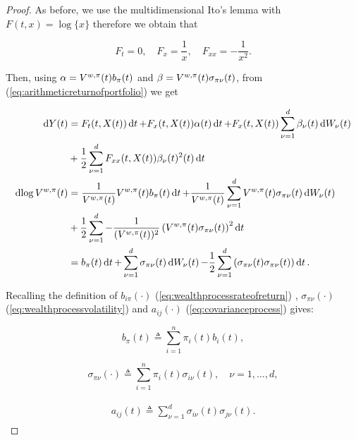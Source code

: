 \documentclass[british]{amsart} \usepackage{lmodern}
\numberwithin{equation}{section} \numberwithin{figure}{section}
\theoremstyle{plain} \newtheorem{thm}{\protect\theoremname}[section]
\theoremstyle{definition} \newtheorem{defn}[thm]{\protect\definitionname}
\theoremstyle{plain} \newtheorem{assumption}[thm]{\protect\assumptionname}
\theoremstyle{plain} \newtheorem{lem}[thm]{\protect\lemmaname}
\theoremstyle{plain} \newtheorem{prop}[thm]{\protect\propositionname}
\theoremstyle{remark} \newtheorem{rem}[thm]{\protect\remarkname}
\theoremstyle{plain} \newtheorem{cor}[thm]{\protect\corollaryname}
\renewcommand{\d}[1]{\mathop{\mathrm{d}{#1}}}
\newcommand{\defeq}{\mathop{\triangleq}} \newcommand{\almostsurely}{\text{a.s.}}
\newcommand{\V}{V^{w,\pi}}
\begin{document}
\newcommand{\VFxx}{-\frac{1}{(\V(t))^2}}
\begin{proof}

  As before, we use the multidimensional Ito's lemma with $F(t,x)=\log\{x\}$ therefore we obtain that

  \begin{equation}
    F_{t}=0, \quad F_{x}=\frac{1}{x}, \quad F_{xx}=-\frac{1}{x^2}.
  \end{equation}

  Then, using $\alpha=\Valpha$ and $\beta=\Vbeta$, from (\ref{eq:arithmeticreturnofportfolio}) we get

  \begin{gather*}
    \begin{split}
      \d{Y(t)} &= F_{t}(t, X(t))\d{t} + F_{x}(t,X(t)) \alpha(t)\d{t} 
         + F_{x}(t,X(t)) \sum_{\nu=1}^d \beta_{\nu}(t)\d{W_{\nu}(t)} \\
         &+ \frac{1}{2} \sum_{\nu=1}^d F_{xx}(t,X(t)) \beta_{\nu}(t)^{2}(t)\d{t} \\
     \d{\log{\V(t)}} 
         &= \VFx \Valpha \d{t} + \VFx \sum_{\nu=1}^d \Vbeta \d{W_{\nu}(t)} \\
            &+ \frac{1}{2} \sum_{\nu=1}^d \VFxx \left( \Vbeta \right)^{2} \d{t} \\
         &= b_{\pi}(t) \d{t} 
            + \sum_{\nu=1}^d \sigma_{\pi\nu}(t)  \d{W_{\nu}(t)} 
             - \frac{1}{2} \sum_{\nu=1}^d \left( \sigma_{\pi\nu}(t)\sigma_{\pi\nu}(t) \right) \d{t}. \\
    \end{split}
  \end{gather*}

  Recalling the definition of $b_{i\pi}(\cdot)$ (\ref{eq:wealthprocessrateofreturn})
  , $\sigma_{\pi\nu}(\cdot)$ (\ref{eq:wealthprocessvolatility}) and
  $a_{ij}(\cdot)$ (\ref{eq:covarianceprocess}) gives:

  \begin{equation*}
    b_{\pi}(t) \defeq \sum_{i=1}^{n} \pi_{i}(t) b_{i}(t),
  \end{equation*}

  \begin{equation*}
    \sigma_{\pi\nu}(\cdot) \defeq \sum_{i=1}^{n} \pi_{i}(t) \sigma_{i\nu}(t),
    \quad \nu=1,\dots,d,
  \end{equation*}

  \begin{gather*}
    \begin{split}
      a_{ij}(t) \defeq \sum_{\nu=1}^{d}\sigma_{i\nu}(t)\sigma_{j\nu}(t).
    \end{split}
  \end{gather*}


\end{proof}
\end{document}
